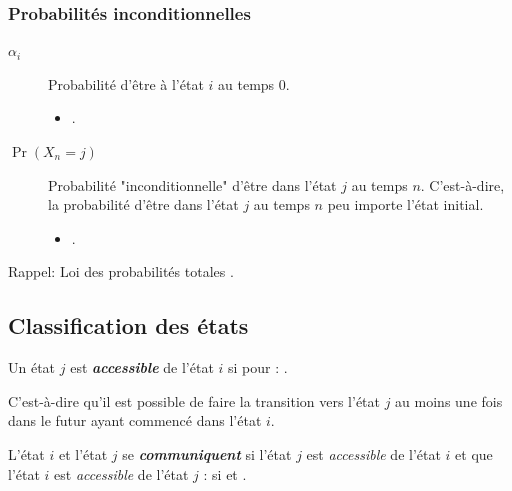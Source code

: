 \documentclass[french]{article}
\begin{document}
\begin{multicols*}{2}
\subsubsection{Probabilités inconditionnelles}
\begin{distributions}[Notation]
\begin{description}
	\item[$\alpha_{i}$]	Probabilité d'être à l'état $i$ au temps 0.
		\begin{itemize}
		\item	{}.
		\end{itemize}
	\item[$\Pr(X_{n} = j)$]	Probabilité "inconditionnelle" d'être dans l'état $j$ au temps $n$. C'est-à-dire, la probabilité d'être dans l'état $j$ au temps $n$ peu importe l'état initial.
		\begin{itemize}
		\item	{}.
		\end{itemize}
\end{description}
\end{distributions}

\begin{rappel}{Rappel: Loi des probabilités totales}
.
\end{rappel}



\columnbreak
\subsection{Classification des états}
\begin{definitionNOHFILLprop}
Un état $j$ est \textbf{\textit{accessible}} de l'état $i$ si  pour  : .

\bigskip

C'est-à-dire qu'il est possible de faire la transition vers l'état $j$ au moins une fois dans le futur ayant commencé dans l'état $i$.
\end{definitionNOHFILLprop}

\begin{definitionNOHFILLprop}
L'état $i$ et l'état $j$ se \textit{\textbf{communiquent}} si l'état $j$ est \textit{accessible} de l'état $i$ et que l'état $i$ est \textit{accessible} de l'état $j$ :  si  et .
\end{definitionNOHFILLprop}


\end{multicols*}
\end{document}
